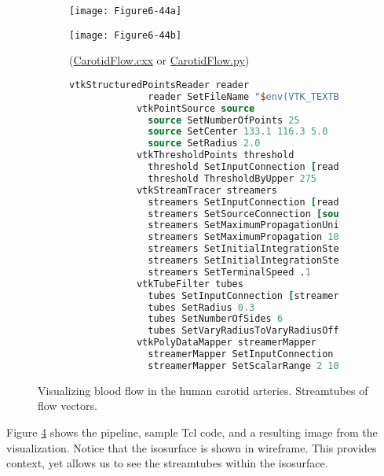 \begin{figure}[!htb]
	\begin{subfigure}[h]{0.48\linewidth}
		\texttt{[image: Figure6-44a]}
		\caption*{}
		\label{fig:Figure6-44a}
	\end{subfigure}
	\hfill
	\begin{subfigure}[h]{0.48\linewidth}
		\texttt{[image: Figure6-44b]}
		\caption*{(\href{https://lorensen.github.io/VTKExamples/site/Cxx/VisualizationAlgorithms/CarotidFlow/}{CarotidFlow.cxx} or \href{https://lorensen.github.io/VTKExamples/site/Python/VisualizationAlgorithms/CarotidFlow/}{CarotidFlow.py})}
		\label{fig:Figure6-44b}
	\end{subfigure}
	\hfill
	\begin{subfigure}[h]{0.96\linewidth}
		\caption*{}
	\end{subfigure}
	\hfill
	\begin{subfigure}[h]{0.96\linewidth}
		\begin{lstlisting}[language=TCL, caption={}]
			vtkStructuredPointsReader reader
			  reader SetFileName "$env(VTK_TEXTBOOK_DATA)/carotid.vtk"
			vtkPointSource source
			  source SetNumberOfPoints 25
			  source SetCenter 133.1 116.3 5.0
			  source SetRadius 2.0
			vtkThresholdPoints threshold
			  threshold SetInputConnection [reader GetOutputPort]
			  threshold ThresholdByUpper 275
			vtkStreamTracer streamers
			  streamers SetInputConnection [reader GetOutputPort]
			  streamers SetSourceConnection [source GetOutputPort]
			  streamers SetMaximumPropagationUnitToTimeUnit
			  streamers SetMaximumPropagation 100.0
			  streamers SetInitialIntegrationStepUnitToCellLengthUnit
			  streamers SetInitialIntegrationStep 0.2
			  streamers SetTerminalSpeed .1
			vtkTubeFilter tubes
			  tubes SetInputConnection [streamers GetOutputPort]
			  tubes SetRadius 0.3
			  tubes SetNumberOfSides 6
			  tubes SetVaryRadiusToVaryRadiusOff
			vtkPolyDataMapper streamerMapper
			  streamerMapper SetInputConnection [tubes GetOutputPort]
			  streamerMapper SetScalarRange 2 10
		\end{lstlisting}
		\caption*{}
		\label{fig:Figure6-44c}
	\end{subfigure}
	\caption{Visualizing blood flow in the human carotid arteries. Streamtubes of flow vectors.}\label{fig:Figure6-44}
\end{figure}


Figure \ref{fig:Figure6-44} shows the pipeline, sample Tcl code, and a resulting image from the visualization. Notice that the isosurface is shown in wireframe. This provides context, yet allows us to see the streamtubes within the isosurface.

